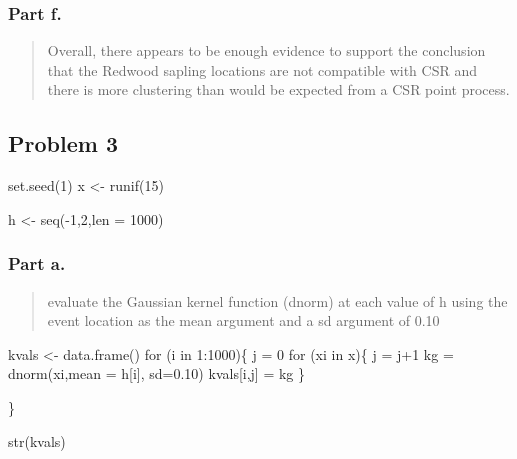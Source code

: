 \documentclass[
  letterpaper,
  DIV=11,
  numbers=noendperiod]{scrartcl}
\newenvironment{Shaded}{\begin{snugshade}}{\end{snugshade}}
\newcommand{\AttributeTok}[1]{\textcolor[rgb]{0.40,0.45,0.13}{#1}}
\newcommand{\ControlFlowTok}[1]{\textcolor[rgb]{0.00,0.23,0.31}{#1}}
\newcommand{\DecValTok}[1]{\textcolor[rgb]{0.68,0.00,0.00}{#1}}
\newcommand{\FloatTok}[1]{\textcolor[rgb]{0.68,0.00,0.00}{#1}}
\newcommand{\FunctionTok}[1]{\textcolor[rgb]{0.28,0.35,0.67}{#1}}
\newcommand{\NormalTok}[1]{\textcolor[rgb]{0.00,0.23,0.31}{#1}}
\newcommand{\OtherTok}[1]{\textcolor[rgb]{0.00,0.23,0.31}{#1}}
\newcommand{\SpecialCharTok}[1]{\textcolor[rgb]{0.37,0.37,0.37}{#1}}
\begin{document}
\hypertarget{part-f.}{%
\subsubsection{Part f.}\label{part-f.}}

\begin{quote}
Overall, there appears to be enough evidence to support the conclusion
that the Redwood sapling locations are not compatible with CSR and there
is more clustering than would be expected from a CSR point process.
\end{quote}

\hypertarget{problem-3}{%
\subsection{Problem 3}\label{problem-3}}

\begin{Shaded}
\begin{Highlighting}[]
\FunctionTok{set.seed}\NormalTok{(}\DecValTok{1}\NormalTok{)}
\NormalTok{x }\OtherTok{\textless{}{-}} \FunctionTok{runif}\NormalTok{(}\DecValTok{15}\NormalTok{)}

\NormalTok{h }\OtherTok{\textless{}{-}} \FunctionTok{seq}\NormalTok{(}\SpecialCharTok{{-}}\DecValTok{1}\NormalTok{,}\DecValTok{2}\NormalTok{,}\AttributeTok{len =} \DecValTok{1000}\NormalTok{)}
\end{Highlighting}
\end{Shaded}

\hypertarget{part-a.-2}{%
\subsubsection{Part a.}\label{part-a.-2}}

\begin{quote}
evaluate the Gaussian kernel function (dnorm) at each value of h using
the event location as the mean argument and a sd argument of 0.10
\end{quote}

\begin{Shaded}
\begin{Highlighting}[]
\NormalTok{kvals }\OtherTok{\textless{}{-}} \FunctionTok{data.frame}\NormalTok{()}
\ControlFlowTok{for}\NormalTok{ (i }\ControlFlowTok{in} \DecValTok{1}\SpecialCharTok{:}\DecValTok{1000}\NormalTok{)\{}
\NormalTok{  j }\OtherTok{=} \DecValTok{0}
  \ControlFlowTok{for}\NormalTok{ (xi }\ControlFlowTok{in}\NormalTok{ x)\{}
\NormalTok{    j }\OtherTok{=}\NormalTok{ j}\SpecialCharTok{+}\DecValTok{1}
\NormalTok{    kg }\OtherTok{=} \FunctionTok{dnorm}\NormalTok{(xi,}\AttributeTok{mean =}\NormalTok{ h[i], }\AttributeTok{sd=}\FloatTok{0.10}\NormalTok{)}
\NormalTok{    kvals[i,j] }\OtherTok{=}\NormalTok{ kg}
\NormalTok{  \}}

\NormalTok{\}}

\FunctionTok{str}\NormalTok{(kvals)}
\end{Highlighting}
\end{Shaded}
\end{document}
